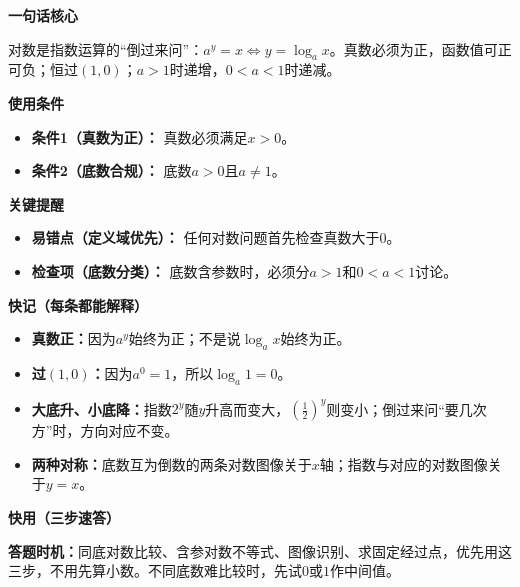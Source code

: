 \clearpage
\begin{summarybox}



	\textbf{\textcolor{CSummary}{一句话核心}}

	对数是指数运算的“倒过来问”：$a^y=x\iff y=\log_a x$。真数必须为正，函数值可正可负；恒过$(1,0)$；$a>1$时递增，$0<a<1$时递减。

	\medskip
	\textbf{\textcolor{CSummary}{使用条件}}
	\begin{itemize}[leftmargin=*, itemsep=0.5em, topsep=0.4em]
		\item \textbf{条件1（真数为正）：} 真数必须满足$x>0$。
		\item \textbf{条件2（底数合规）：} 底数$a>0$且$a\neq 1$。
	\end{itemize}

	\medskip
	\textbf{\textcolor{CSummary}{关键提醒}}
	\begin{itemize}[leftmargin=*, itemsep=0.5em, topsep=0.4em]
		\item \textbf{易错点（定义域优先）：} 任何对数问题首先检查真数大于$0$。
		\item \textbf{检查项（底数分类）：} 底数含参数时，必须分$a>1$和$0<a<1$讨论。
\end{itemize}

\medskip
\textbf{\textcolor{CSummary}{快记（每条都能解释）}}
\begin{itemize}[leftmargin=*,itemsep=0.35em,topsep=0.3em]
 \item \textbf{真数正：}因为$a^y$始终为正；不是说$\log_a x$始终为正。
 \item \textbf{过$(1,0)$：}因为$a^0=1$，所以$\log_a1=0$。
 \item \textbf{大底升、小底降：}指数$2^y$随$y$升高而变大，$(\tfrac12)^y$则变小；倒过来问“要几次方”时，方向对应不变。
 \item \textbf{两种对称：}底数互为倒数的两条对数图像关于$x$轴；指数与对应的对数图像关于$y=x$。
\end{itemize}

\medskip
\textbf{\textcolor{CSummary}{快用（三步速答）}}

\begin{center}
\end{center}

\textbf{答题时机：}同底对数比较、含参对数不等式、图像识别、求固定经过点，优先用这三步，不用先算小数。不同底数难比较时，先试$0$或$1$作中间值。
\end{summarybox}

